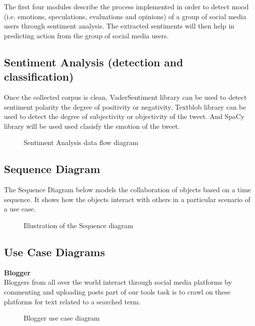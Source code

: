 The first four modules describe the process implemented in order to detect mood (i.e. emotions,
speculations, evaluations and opinions) of a group of social media users through sentiment
analysis. The extracted sentiments will then help in predicting action from the group of social
media users.

\subsection{Sentiment Analysis (detection and classification)}
Once the collected corpus is clean, VaderSentiment library can be used to detect sentiment polarity the degree of positivity or negativity. Textblob library can be used to detect the degree of subjectivity or objectivity of the tweet. And SpaCy library will be used used clasisfy the emotion of the tweet.

\begin{figure}[h]
  \centering
  \caption[Sentiment Analysis data flow diagram]%
  {Sentiment Analysis data flow diagram}
  \label{fig:ALAP:sm1}
\end{figure}


\subsection{Sequence Diagram}
The Sequence Diagram below models the collaboration of objects based on a time sequence.
It shows how the objects interact with others in a particular scenario of a use case.

\begin{figure}[h]
  \centering
  \caption[Illustration of the Sequence diagram]%
  {Illustration of the Sequence diagram}
  \label{fig:ALAP:sm1}
\end{figure}


\subsection{Use Case Diagrams}
\textbf{Blogger}\\
Bloggers from all over the world interact through social media platforms by commenting and
uploading posts part of our tool\textquotesingle s task is to crawl on these platforms for text related to a searched term. 



\begin{figure}[h]
  \centering
  \caption[Blogger use case diagram]%
  {Blogger use case diagram}
  \label{fig:ALAP:sm1}
\end{figure}

